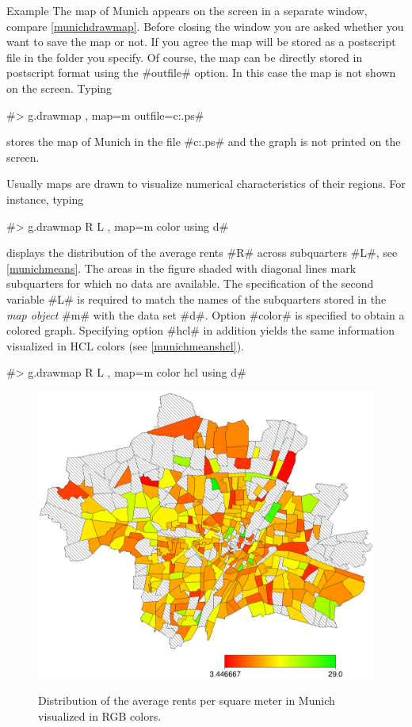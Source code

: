 \begin{stanza}{Example}
The map of Munich appears on the screen in a separate window,
compare \autoref{munichdrawmap}. Before closing the window you are
asked whether you want to save the map or not. If you agree the
map will be stored as a postscript file in the folder you specify.
Of course, the map can be directly stored in postscript format
using the #outfile# option. In this case the map is not shown on
the screen. Typing

#> g.drawmap , map=m outfile=c:\temp\munich.ps#

stores the map of Munich in the file #c:\temp\munich.ps# and the
graph is not printed on the screen.

Usually maps are drawn to visualize numerical characteristics of
their regions. For instance, typing

#> g.drawmap R L , map=m color using d#

displays the distribution of the average rents #R# across
subquarters #L#, see \autoref{munichmeans}. The areas in the
figure shaded with diagonal lines mark subquarters for which  no
data are available. The specification of the second variable #L#
is required to match the names of the subquarters stored in the
{\em map object} #m# with the data set #d#. Option #color# is
specified to obtain a colored graph. Specifying option #hcl# in
addition yields the same information visualized in HCL colors (see
\autoref{munichmeanshcl}).

#> g.drawmap R L , map=m color hcl using d#

\end{stanza}

\begin{figure}[htb]
\begin{center}
\includegraphics[scale=0.5]{grafiken/munichmeansdrawmap.ps}
{\em\caption{ \label{munichmeans} Distribution of the average rents
per square meter in Munich visualized in RGB colors.}}
\end{center}
\end{figure}

